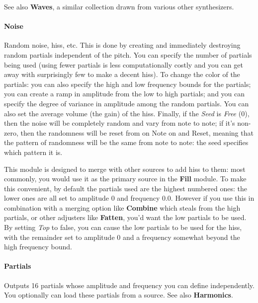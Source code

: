 \documentclass{article}
\begin{document}
See also {\bf Waves}, a similar collection drawn from various other synthesizers.



\paragraph{Noise}  Random noise, hiss, etc.  This is done by creating and immediately destroying random partials independent of the pitch.  You can specify the number of partials being used (using fewer partials is less computationally costly and you can get away with surprisingly few to make a decent hiss).   To change the color of the partials: you can also specify the high and low frequency bounds for the partials; you can create a ramp in amplitude from the low to high partials; and you can specify the degree of variance in amplitude among the random partials.  You can also set the average volume (the gain) of the hiss.  Finally, if the {\it Seed} is {\it Free} (0), then the noise will be completely random and vary from note to note; if it's non-zero, then the randomness will be reset from on Note on and Reset, meaning that the pattern of randomness will be the same from note to note: the seed specifies which pattern it is.

This module is designed to merge with other sources to add hiss to them: most commonly, you would use it as the primary source in the {\bf Fill} module.  To make this convenient, by default the partials used are the highest numbered ones: the lower ones are all set to amplitude 0 and frequency 0.0.  However if you use this in combination with a merging option like {\bf Combine} which steals from the high partials, or other adjusters like {\bf Fatten}, you'd want the low partials to be used.  By setting {\it Top} to false, you can cause the low partials to be used for the hiss, with the remainder set to amplitude 0 and a frequency somewhat beyond the high frequency bound.  


\paragraph{Partials}  Outputs 16 partials whose amplitude and frequency you can define independently.  You optionally can load these partials from a source.  See also {\bf Harmonics}.
\end{document}
